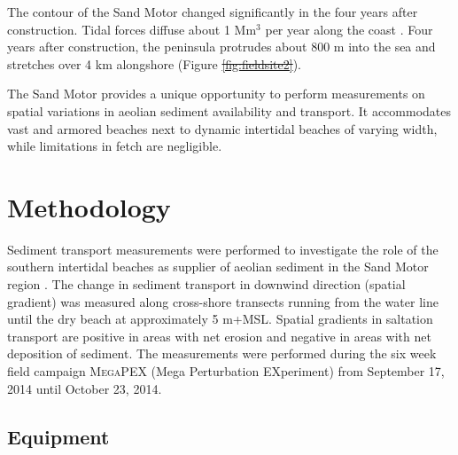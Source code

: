 \documentclass[preprint,12pt,authoryear,a4paper]{elsarticle}
\newcommand{\mrq}[2][]{}
\providecommand{\DIFadd}[1]{{\protect\color{blue}\uwave{#1}}} %
\providecommand{\DIFdel}[1]{{\protect\color{red}\sout{#1}}}                      %
\providecommand{\DIFaddbegin}{} %
\providecommand{\DIFaddend}{} %
\providecommand{\DIFdelbegin}{} %
\providecommand{\DIFdelend}{} %
\begin{document}
The contour of the Sand Motor changed significantly in the four years
after construction. Tidal forces diffuse about 1 $\mathrm{Mm^3}$ per
year along the coast \citep{deSchipper2016}. Four years after
construction, the peninsula protrudes about 800 m into the sea and
stretches over 4 km alongshore (Figure \DIFdelbegin \DIFdel{\ref{fig:fieldsite2}}\DIFdelend \DIFaddbegin \DIFadd{\ref{fig:fieldsite}, lower
panels}\DIFaddend ).

\DIFdelbegin %

\DIFdelend The Sand Motor provides a unique opportunity to perform measurements
on spatial variations in aeolian sediment availability and transport.
It accommodates vast and armored beaches next to dynamic intertidal
beaches of varying width, while limitations in fetch are negligible.

\section{Methodology}

Sediment transport measurements were performed to investigate the role
of the southern intertidal beaches as supplier of aeolian sediment in
the Sand Motor region \citep{Hoonhout2017a}. The change in sediment
transport in downwind direction (spatial gradient) was measured along
cross-shore transects running from the water line until the dry beach
at approximately 5 m+MSL. Spatial gradients in saltation transport are
positive in areas with net erosion and negative in areas with net
deposition of sediment. \mrq[ls]{2.1} The measurements were performed
during the six week field campaign \textsc{MegaPEX} (Mega Perturbation
EXperiment) from September 17, 2014 until October 23, 2014.

\subsection{Equipment}
\end{document}
